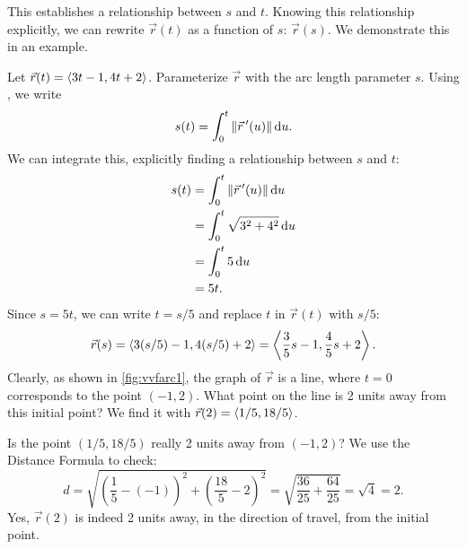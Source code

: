 This establishes a relationship between $s$ and $t$. Knowing this relationship explicitly, we can rewrite $\vec r(t)$ as a function of $s$: $\vec r(s)$. We demonstrate this in an example.


\begin{example}\label{ex_vvfarc1}%
Let $\vec r(t) =\left\langle 3t-1,4t+2\right\rangle$. Parameterize $\vec r$ with the arc length parameter $s$.
\solution
Using , we write
\[s(t) = \int_0^t \left\lVert \vec r\,'(u) \right\rVert\operatorname{d}\! u.\]
We can integrate this, explicitly finding a relationship between $s$ and $t$:
\begin{align*}
s(t) &= \int_0^t \left\lVert \vec r\,'(u) \right\rVert\operatorname{d}\! u \\
			&= \int_0^t \sqrt{3^2+4^2}\operatorname{d}\! u\\
			&= \int_0^t 5\operatorname{d}\! u\\
			&= 5t.
\end{align*}
Since $s=5t$, we can write $t=s/5$ and replace $t$ in $\vec r(t)$ with $s/5$:
\[\vec r(s) =\left\langle 3(s/5)-1, 4(s/5)+2\right\rangle=\left\langle \frac35s-1,\frac45s+2\right\rangle.\]
Clearly, as shown in \autoref{fig:vvfarc1}, the graph of $\vec r$ is a line, where $t=0$ corresponds to the point $(-1,2)$. What point on the line is 2 units away from this initial point? We find it with $\vec r(2) =\left\langle 1/5, 18/5\right\rangle$. 


Is the point $(1/5,18/5)$ really 2 units away from $(-1,2)$? We use the Distance Formula to check:
\[
d = \sqrt{\left(\frac15-(-1)\right)^2+ \left(\frac{18}5-2\right)^2} = \sqrt{\frac{36}{25}+\frac{64}{25}} = \sqrt{4}=2.
\]
Yes, $\vec r(2)$ is indeed 2 units away, in the direction of travel, from the initial point.
\end{example}


